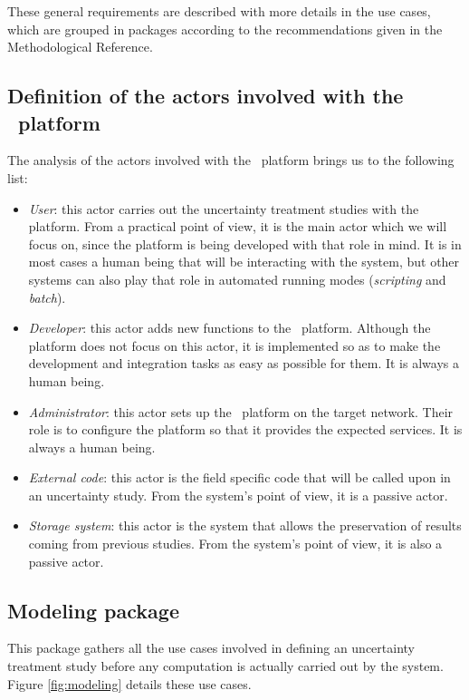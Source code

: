 These general requirements are described with more details in the use cases, which are grouped in packages according to the recommendations given in the Methodological Reference.

\subsection{Definition of the actors involved with the \OT\ platform}

The analysis of the actors involved with the \OT\ platform brings us to the following list:
\begin{itemize}
\item \emph{User}: this actor carries out the uncertainty treatment studies with the platform. From a practical point of view, it is the main actor which we will focus on, since the platform is being developed with that role in mind. It is in most cases a human being that will be interacting with the system, but other systems can also play that role in automated running modes (\emph{scripting} and \emph{batch}).
\item \emph{Developer}: this actor adds new functions to the \OT\ platform. Although the platform does not focus on this actor, it is implemented so as to make the development and integration tasks as easy as possible for them. It is always a human being.
\item \emph{Administrator}: this actor sets up the \OT\ platform on the target network. Their role is to configure the platform so that it provides the expected services. It is always a human being.
\item \emph{External code}: this actor is the field specific code that will be called upon in an uncertainty study. From the system's point of view, it is a passive actor.
\item \emph{Storage system}: this actor is the system that allows the preservation of results coming from previous studies. From the system's point of view, it is also a passive actor.
\end{itemize}

\subsection{Modeling package}

This package gathers all the use cases involved in defining an uncertainty treatment study before any computation is actually carried out by the system. Figure \ref{fig:modeling} details these use cases.

